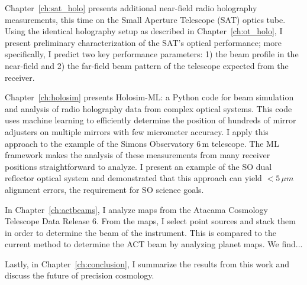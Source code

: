 Chapter~\ref{ch:sat_holo} presents additional near-field radio holography measurements, this time on the Small Aperture Telescope (SAT) optics tube.  Using the identical holography setup as described in Chapter~\ref{ch:ot_holo}, I present preliminary characterization of the SAT's optical performance; more specifically, I predict two key performance parameters: 1) the beam profile in the near-field and 2) the far-field beam pattern of the telescope expected from the receiver.

Chapter~\ref{ch:holosim} presents Holosim-ML: a Python code for beam simulation and analysis of radio holography data from complex optical systems.  This code uses machine learning to efficiently determine the position of hundreds of mirror adjusters on multiple mirrors with few micrometer accuracy.  I apply this approach to the example of the Simons Observatory 6\,m telescope.  The ML framework makes the analysis of these measurements from many receiver positions straightforward to analyze.  I present an example of the SO dual reflector optical system and demonstrated that this approach can yield $<5\,\mu m$ alignment errors, the requirement for SO science goals.

In Chapter~\ref{ch:actbeams}, I analyze maps from the Atacama Cosmology Telescope Data Release 6.  From the maps, I select point sources and stack them in order to determine the beam of the instrument.  This is compared to the current method to determine the ACT beam by analyzing planet maps.  We find...

Lastly, in Chapter~\ref{ch:conclusion}, I summarize the results from this work and discuss the future of precision cosmology.